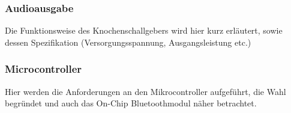 \subsubsection{Audioausgabe}
Die Funktionsweise des Knochenschallgebers wird hier kurz erläutert, sowie dessen Spezifikation (Versorgungsspannung, Ausgangsleistung etc.)


\subsubsection{Microcontroller}
Hier werden die Anforderungen an den Mikrocontroller aufgeführt, die Wahl begründet und auch das On-Chip Bluetoothmodul näher betrachtet.
